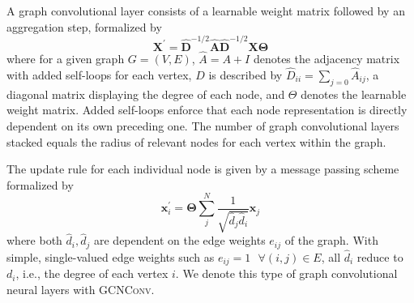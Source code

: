 \documentclass{bioinfo}
\begin{document}
A graph convolutional layer \citet{GCNConv} consists of a learnable
weight matrix followed by an aggregation step, formalized by
\begin{equation}
	\mathbf{X}^{\prime} = \mathbf{\hat{D}}^{-1/2} \mathbf{\hat{A}}
	\mathbf{\hat{D}}^{-1/2} \mathbf{X} \mathbf{\Theta}
\end{equation}
where for a given graph $G=(V,E)$, $\hat{A} = A + I$ denotes the
adjacency matrix with added self-loops for each vertex, $D$ is
described by $\hat{D}_{ii} = \sum_{j=0} \hat{A}_{ij}$, a diagonal
matrix displaying the degree of each node, and $\Theta$ denotes the
learnable weight matrix. Added self-loops enforce that each node
representation is directly dependent on its own preceding one. The
number of graph convolutional layers stacked equals the radius of
relevant nodes for each vertex within the graph.

The update rule for each individual node is given by a message passing scheme formalized by
\begin{equation}
	\mathbf{x}^{\prime}_i = \mathbf{\Theta} \sum^{N}_{j}
	\frac{1}{\sqrt{\hat{d}_j \hat{d}_i}} \mathbf{x}_j
\end{equation}
where both $\hat{d}_i, \hat{d}_j$ are dependent on the edge weights
$e_{ij}$ of the graph. With simple, single-valued edge weights such as
$e_{ij}=1 \text{ }\forall (i,j)\in E$, all $\hat{d}_i$ reduce to
$d_i$, i.e., the degree of each vertex $i$. We denote this type of
graph convolutional neural layers with \textsc{GCNConv}.
\end{document}
